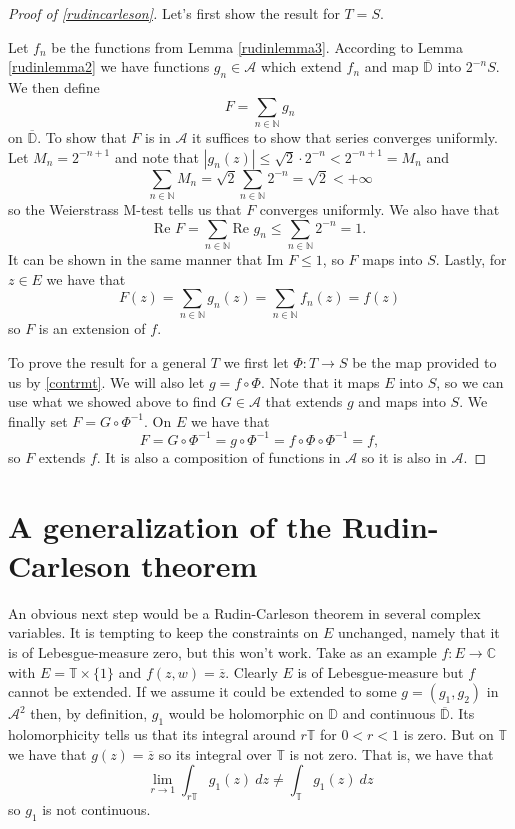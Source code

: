 \documentclass[a4paper,12pt,twoside,BCOR=10mm]{scrbook}
\theoremstyle{definition}
\theoremstyle{definition}
\theoremstyle{definition}
\renewcommand{\Re}{\text{Re }}
\renewcommand{\Im}{\text{Im }}
\begin{document}
\begin{proof}[Proof of \ref{rudincarleson}]
Let's first show the result for $T = S$.

Let $f_n$ be the functions from Lemma \ref{rudinlemma3}.
According to Lemma \ref{rudinlemma2} we have functions $g_n \in \mathcal{A}$ which extend $f_n$ and map $\overline{\mathbb{D}}$ into $2^{-n}S$.
We then define
\[
	F = \sum_{n \in \mathbb{N}} g_n
\]
on $\overline{\mathbb{D}}$.
To show that $F$ is in $\mathcal{A}$ it suffices to show that series converges uniformly.
Let $M_n = 2^{-n + 1}$ and note that $|g_n(z)| \leq \sqrt{2}\cdot 2^{-n} < 2^{-n + 1} = M_n$ and
\[
	\sum_{n \in \mathbb{N}} M_n
	=
	\sqrt{2}\sum_{n \in \mathbb{N}} 2^{-n} =
	\sqrt{2} < +\infty
\]
so the Weierstrass M-test tells us that $F$ converges uniformly.
We also have that
\[
	\Re F = \sum_{n \in \mathbb{N}} \Re g_n \leq \sum_{n \in \mathbb{N}} 2^{-n} = 1.
\]
It can be shown in the same manner that $\Im F \leq 1$, so $F$ maps into $S$.
Lastly, for $z \in E$ we have that
\[
	F(z) = \sum_{n \in \mathbb{N}} g_n(z) = \sum_{n \in \mathbb{N}} f_n(z) = f(z)
\]
so $F$ is an extension of $f$.

To prove the result for a general $T$ we first let $\Phi: T \rightarrow S$ be the map provided to us by \ref{contrmt}.
We will also let $g = f \circ \Phi$.
Note that it maps $E$ into $S$, so we can use what we showed above to find $G \in \mathcal{A}$ that extends $g$ and maps into $S$.
We finally set $F = G \circ \Phi^{-1}$.
On $E$ we have that
\[
	F = G \circ \Phi^{-1} = g \circ \Phi^{-1} = f \circ \Phi \circ \Phi^{-1} = f,
\]
so $F$ extends $f$.
It is also a composition of functions in $\mathcal{A}$ so it is also in $\mathcal{A}$.
\end{proof}



\section{A generalization of the Rudin-Carleson theorem}
\label{section3}
An obvious next step would be a Rudin-Carleson theorem in several complex variables.
It is tempting to keep the constraints on $E$ unchanged, namely that it is of Lebesgue-measure zero, but this won't work.
Take as an example $f: E \rightarrow \mathbb{C}$ with $E = \mathbb{T} \times \{1\}$ and $f(z, w) = \overline{z}$.
Clearly $E$ is of Lebesgue-measure but $f$ cannot be extended.
If we assume it could be extended to some $g = (g_1, g_2)$ in $\mathcal{A}^2$ then, by definition, $g_1$ would be holomorphic on $\mathbb{D}$ and continuous $\overline{\mathbb{D}}$.
Its holomorphicity tells us that its integral around $r\mathbb{T}$ for $0 < r < 1$ is zero.
But on $\mathbb{T}$ we have that $g(z) = \overline{z}$ so its integral over $\mathbb{T}$ is not zero.
That is, we have that
\[
	\lim_{r \rightarrow 1} \int_{r\mathbb{T}} g_1(z)\ dz \neq \int_{\mathbb{T}} g_1(z)\ dz
\]
so $g_1$ is not continuous.
\end{document}

